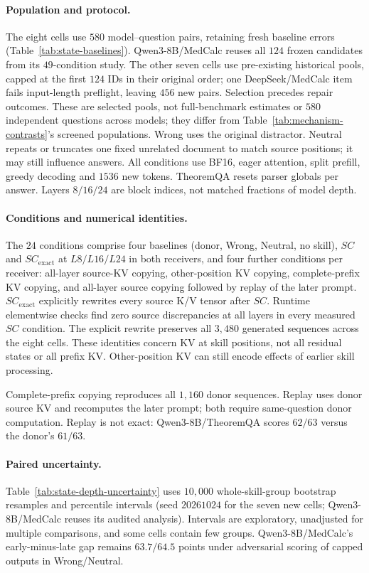 \paragraph{Population and protocol.}
The eight cells use $580$ model--question pairs, retaining fresh baseline
errors (Table~\ref{tab:state-baselines}). Qwen3-8B/MedCalc reuses all $124$
frozen candidates from its $49$-condition study. The other seven cells use
pre-existing historical pools, capped at the first $124$ IDs in their original
order; one DeepSeek/MedCalc item fails input-length preflight, leaving $456$
new pairs. Selection precedes repair outcomes. These are selected pools,
not full-benchmark estimates or $580$ independent questions across models;
they differ from Table~\ref{tab:mechanism-contrasts}'s screened populations.
Wrong uses the original distractor. Neutral repeats or truncates one fixed
unrelated document to match source positions; it may still influence answers.
All conditions use BF16, eager attention, split prefill, greedy decoding and
$1536$ new tokens. TheoremQA resets parser globals per answer.
Layers $8/16/24$ are block indices, not matched fractions of model depth.

\paragraph{Conditions and numerical identities.}
The $24$ conditions comprise four baselines (donor, Wrong, Neutral,
no skill), $SC$ and $SC_{\mathrm{exact}}$ at $L8/L16/L24$ in both
receivers, and four further conditions per receiver: all-layer source-KV
copying, other-position KV copying, complete-prefix KV copying, and
all-layer source copying followed by replay of the later prompt.
$SC_{\mathrm{exact}}$ explicitly rewrites every source K/V tensor after
$SC$. Runtime elementwise checks find zero source discrepancies at all
layers in every measured $SC$ condition. The explicit rewrite preserves
all $3{,}480$ generated sequences across the eight cells. These identities
concern KV at skill positions, not all residual states or all prefix KV.
Other-position KV can still encode effects of earlier skill processing.

Complete-prefix copying reproduces all $1{,}160$ donor sequences.
Replay uses donor source KV and recomputes the later prompt; both require
same-question donor computation. Replay is not exact: Qwen3-8B/TheoremQA
scores $62/63$ versus the donor's $61/63$.

\paragraph{Paired uncertainty.}
Table~\ref{tab:state-depth-uncertainty} uses $10{,}000$ whole-skill-group
bootstrap resamples and percentile intervals (seed $20261024$ for the seven
new cells; Qwen3-8B/MedCalc reuses its audited analysis). Intervals are
exploratory, unadjusted for multiple comparisons, and some cells contain
few groups. Qwen3-8B/MedCalc's early-minus-late gap remains $63.7/64.5$
points under adversarial scoring of capped outputs in Wrong/Neutral.

